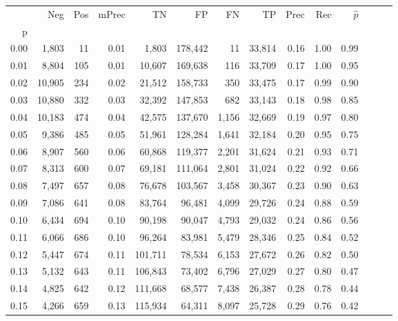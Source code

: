 \begin{tabular}{rrrrrrrrrrrrrr}
\toprule
{} &     Neg &  Pos & mPrec &       TN &       FP &      FN &      TP &  Prec &   Rec & $\hat{p}$ \\
p    &         &      &       &          &          &         &         &       &       &           \\
\midrule
0.00 &   1,803 &   11 &  0.01 &    1,803 &  178,442 &      11 &  33,814 &  0.16 &  1.00 &      0.99 \\
0.01 &   8,804 &  105 &  0.01 &   10,607 &  169,638 &     116 &  33,709 &  0.17 &  1.00 &      0.95 \\
0.02 &  10,905 &  234 &  0.02 &   21,512 &  158,733 &     350 &  33,475 &  0.17 &  0.99 &      0.90 \\
0.03 &  10,880 &  332 &  0.03 &   32,392 &  147,853 &     682 &  33,143 &  0.18 &  0.98 &      0.85 \\
0.04 &  10,183 &  474 &  0.04 &   42,575 &  137,670 &   1,156 &  32,669 &  0.19 &  0.97 &      0.80 \\
0.05 &   9,386 &  485 &  0.05 &   51,961 &  128,284 &   1,641 &  32,184 &  0.20 &  0.95 &      0.75 \\
0.06 &   8,907 &  560 &  0.06 &   60,868 &  119,377 &   2,201 &  31,624 &  0.21 &  0.93 &      0.71 \\
0.07 &   8,313 &  600 &  0.07 &   69,181 &  111,064 &   2,801 &  31,024 &  0.22 &  0.92 &      0.66 \\
0.08 &   7,497 &  657 &  0.08 &   76,678 &  103,567 &   3,458 &  30,367 &  0.23 &  0.90 &      0.63 \\
0.09 &   7,086 &  641 &  0.08 &   83,764 &   96,481 &   4,099 &  29,726 &  0.24 &  0.88 &      0.59 \\
0.10 &   6,434 &  694 &  0.10 &   90,198 &   90,047 &   4,793 &  29,032 &  0.24 &  0.86 &      0.56 \\
0.11 &   6,066 &  686 &  0.10 &   96,264 &   83,981 &   5,479 &  28,346 &  0.25 &  0.84 &      0.52 \\
0.12 &   5,447 &  674 &  0.11 &  101,711 &   78,534 &   6,153 &  27,672 &  0.26 &  0.82 &      0.50 \\
0.13 &   5,132 &  643 &  0.11 &  106,843 &   73,402 &   6,796 &  27,029 &  0.27 &  0.80 &      0.47 \\
0.14 &   4,825 &  642 &  0.12 &  111,668 &   68,577 &   7,438 &  26,387 &  0.28 &  0.78 &      0.44 \\
0.15 &   4,266 &  659 &  0.13 &  115,934 &   64,311 &   8,097 &  25,728 &  0.29 &  0.76 &      0.42 \\

\end{tabular}
